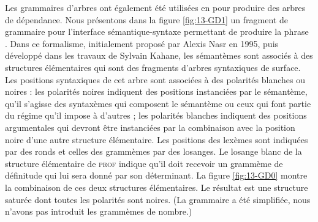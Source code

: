 {Les grammaires d’arbres ont également été utilisées en  pour produire des arbres de dépendance. Nous présentons dans la figure \ref{fig:13-GD1} un fragment de grammaire pour l’interface sémantique-syntaxe permettant de produire la phrase . Dans ce formalisme, initialement proposé par Alexis Nasr en 1995, puis développé dans les travaux de Sylvain Kahane, les sémantèmes sont associés à des structures élémentaires qui sont des fragments d’arbres syntaxiques de surface. Les positions syntaxiques de cet arbre sont associées à des polarités blanches ou noires : les polarités noires indiquent des positions instanciées par le sémantème, qu’il s’agisse des syntaxèmes qui composent le sémantème ou ceux qui font partie du régime qu’il impose à d’autres ; les polarités blanches indiquent des positions argumentales qui devront être instanciées par la combinaison avec la position noire d’une autre structure élémentaire. Les positions des lexèmes sont indiquées par des ronds et celles des grammèmes par des losanges. Le losange blanc de la structure élémentaire de \textsc{prof} indique qu’il doit recevoir un grammème de définitude qui lui sera donné par son déterminant. La figure \ref{fig:13-GD0} montre la combinaison de ces deux structures élémentaires. Le résultat est une structure saturée dont toutes les polarités sont noires. (La grammaire a été simplifiée, nous n’avons pas introduit les grammèmes de nombre.)

\begin{figure}[H]
%
\hspace{0.3cm}\hspace{0.3cm}%
\end{figure}}

